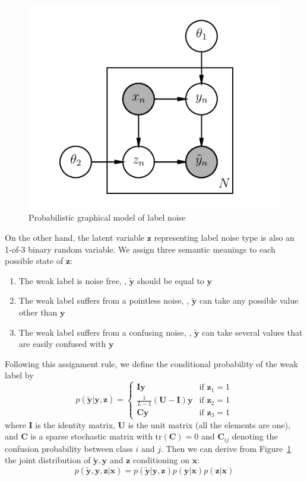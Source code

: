 \documentclass[10pt,twocolumn,letterpaper]{article}
\def\vec{\mathbf}
\def\mat{\mathbf}
\begin{document}
\begin{figure}[t]
\begin{center}
\includegraphics[width=0.6\linewidth]{figure/pgm.pdf}
\end{center}
\caption{Probabilistic graphical model of label noise}
\label{fig:noise_pgm}
\end{figure}

On the other hand, the latent variable $\vec{z}$ representing label noise type is also an 1-of-3 binary random variable. We assign three semantic meanings to each possible state of $\vec{z}$:
\begin{enumerate}
    \item The weak label is noise free, \ie, $\tilde{\vec{y}}$ should be equal to $\vec{y}$
    \item The weak label suffers from a pointless noise, \ie, $\tilde{\vec{y}}$ can take any possible value other than $\vec{y}$
    \item The weak label suffers from a confusing noise, \ie, $\tilde{\vec{y}}$ can take several values that are easily confused with $\vec{y}$
\end{enumerate}

Following this assignment rule, we define the conditional probability of the weak label by
\begin{equation} \label{eq:likelihood}
    p(\tilde{\vec{y}}|\vec{y},\vec{z}) = \begin{cases}
        \mat{I}\vec{y} & \text{if } \vec{z}_1 = 1 \\
        \frac{1}{L-1}(\mat{U} - \mat{I})\vec{y} & \text{if } \vec{z}_2 = 1 \\
        \mat{C}\vec{y} & \text{if } \vec{z}_3 = 1
    \end{cases}
\end{equation}
where $\mat{I}$ is the identity matrix, $\mat{U}$ is the unit matrix (all the elements are one), and $\mat{C}$ is a sparse stochastic matrix with $\mathrm{tr}(\mat{C})=0$ and $\mat{C}_{ij}$ denoting the confusion probability between class $i$ and $j$. Then we can derive from Figure~\ref{fig:noise_pgm} the joint distribution of $\tilde{\vec{y}}, \vec{y}$ and $\vec{z}$ conditioning on $\vec{x}$:
\begin{equation} \label{eq:joint_distribution}
  p(\tilde{\vec{y}}, \vec{y}, \vec{z} | \vec{x}) = p(\tilde{\vec{y}} | \vec{y}, \vec{z}) p(\vec{y} | \vec{x}) p(\vec{z} | \vec{x})
\end{equation}
\end{document}
